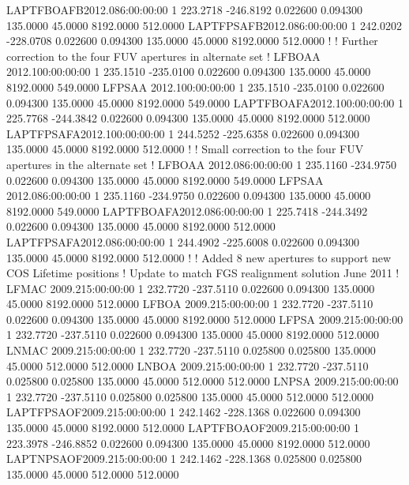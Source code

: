 LAPTFBOAFB2012.086:00:00:00  1    223.2718   -246.8192    0.022600    0.094300    135.0000     45.0000   8192.0000    512.0000
LAPTFPSAFB2012.086:00:00:00  1    242.0202   -228.0708    0.022600    0.094300    135.0000     45.0000   8192.0000    512.0000
!
! Further correction to  the four FUV apertures in alternate set
!
LFBOAA    2012.100:00:00:00  1    235.1510   -235.0100    0.022600    0.094300    135.0000     45.0000   8192.0000    549.0000
LFPSAA    2012.100:00:00:00  1    235.1510   -235.0100    0.022600    0.094300    135.0000     45.0000   8192.0000    549.0000
LAPTFBOAFA2012.100:00:00:00  1    225.7768   -244.3842    0.022600    0.094300    135.0000     45.0000   8192.0000    512.0000
LAPTFPSAFA2012.100:00:00:00  1    244.5252   -225.6358    0.022600    0.094300    135.0000     45.0000   8192.0000    512.0000
!
! Small correction to the four FUV apertures in the alternate set
!
LFBOAA    2012.086:00:00:00  1    235.1160   -234.9750    0.022600    0.094300    135.0000     45.0000   8192.0000    549.0000
LFPSAA    2012.086:00:00:00  1    235.1160   -234.9750    0.022600    0.094300    135.0000     45.0000   8192.0000    549.0000
LAPTFBOAFA2012.086:00:00:00  1    225.7418   -244.3492    0.022600    0.094300    135.0000     45.0000   8192.0000    512.0000
LAPTFPSAFA2012.086:00:00:00  1    244.4902   -225.6008    0.022600    0.094300    135.0000     45.0000   8192.0000    512.0000
!
! Added 8 new apertures to support new COS Lifetime positions
! Update to match FGS realignment solution June 2011
!
LFMAC     2009.215:00:00:00  1    232.7720   -237.5110    0.022600    0.094300    135.0000     45.0000   8192.0000    512.0000
LFBOA     2009.215:00:00:00  1    232.7720   -237.5110    0.022600    0.094300    135.0000     45.0000   8192.0000    512.0000
LFPSA     2009.215:00:00:00  1    232.7720   -237.5110    0.022600    0.094300    135.0000     45.0000   8192.0000    512.0000
LNMAC     2009.215:00:00:00  1    232.7720   -237.5110    0.025800    0.025800    135.0000     45.0000    512.0000    512.0000
LNBOA     2009.215:00:00:00  1    232.7720   -237.5110    0.025800    0.025800    135.0000     45.0000    512.0000    512.0000
LNPSA     2009.215:00:00:00  1    232.7720   -237.5110    0.025800    0.025800    135.0000     45.0000    512.0000    512.0000
LAPTFPSAOF2009.215:00:00:00  1    242.1462   -228.1368    0.022600    0.094300    135.0000     45.0000   8192.0000    512.0000
LAPTFBOAOF2009.215:00:00:00  1    223.3978   -246.8852    0.022600    0.094300    135.0000     45.0000   8192.0000    512.0000
LAPTNPSAOF2009.215:00:00:00  1    242.1462   -228.1368    0.025800    0.025800    135.0000     45.0000    512.0000    512.0000
